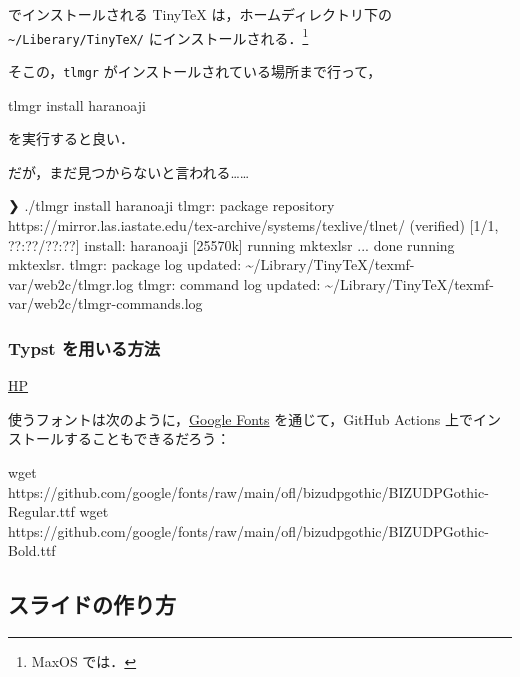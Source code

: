 \documentclass[
]{ltjsarticle}
\newenvironment{Shaded}{\begin{snugshade}}{\end{snugshade}}
\newcommand{\ControlFlowTok}[1]{\textcolor[rgb]{0.00,0.23,0.31}{#1}}
\newcommand{\ExtensionTok}[1]{\textcolor[rgb]{0.00,0.23,0.31}{#1}}
\newcommand{\FunctionTok}[1]{\textcolor[rgb]{0.28,0.35,0.67}{#1}}
\newcommand{\NormalTok}[1]{\textcolor[rgb]{0.00,0.23,0.31}{#1}}
\newcommand{\OperatorTok}[1]{\textcolor[rgb]{0.37,0.37,0.37}{#1}}
\newcommand{\PreprocessorTok}[1]{\textcolor[rgb]{0.68,0.00,0.00}{#1}}
\newcommand{\StringTok}[1]{\textcolor[rgb]{0.13,0.47,0.30}{#1}}
\begin{document}
でインストールされる TinyTeX は，ホームディレクトリ下の
\texttt{\textasciitilde{}/Liberary/TinyTeX/}
にインストールされる．\footnote{MaxOS では．}

そこの，\texttt{tlmgr} がインストールされている場所まで行って，

\begin{Shaded}
\begin{Highlighting}[]
\ExtensionTok{tlmgr}\NormalTok{ install haranoaji}
\end{Highlighting}
\end{Shaded}

を実行すると良い．

だが，まだ見つからないと言われる\ldots\ldots{}

\begin{Shaded}
\begin{Highlighting}[]
\ExtensionTok{❯}\NormalTok{ ./tlmgr install haranoaji        }
\ExtensionTok{tlmgr:}\NormalTok{ package repository https://mirror.las.iastate.edu/tex{-}archive/systems/texlive/tlnet/ }\OperatorTok{(verified)}
\ExtensionTok{[1/1,} \PreprocessorTok{??}\NormalTok{:}\PreprocessorTok{??}\NormalTok{/}\PreprocessorTok{??}\NormalTok{:}\PreprocessorTok{??}\NormalTok{] install: haranoaji }\PreprocessorTok{[}\StringTok{25570k}\PreprocessorTok{]}
\ExtensionTok{running}\NormalTok{ mktexlsr ...}
\ControlFlowTok{done} \ExtensionTok{running}\NormalTok{ mktexlsr.}
\ExtensionTok{tlmgr:}\NormalTok{ package log updated: \textasciitilde{}/Library/TinyTeX/texmf{-}var/web2c/tlmgr.log}
\ExtensionTok{tlmgr:}\NormalTok{ command log updated: \textasciitilde{}/Library/TinyTeX/texmf{-}var/web2c/tlmgr{-}commands.log}
\end{Highlighting}
\end{Shaded}

\subsubsection{Typst
を用いる方法}\label{typst-ux3092ux7528ux3044ux308bux65b9ux6cd5}

\href{https://typst.app/}{HP}

使うフォントは次のように，\href{https://fonts.google.com/specimen/BIZ+UDPGothic}{Google
Fonts} を通じて，GitHub Actions 上でインストールすることもできるだろう：

\begin{Shaded}
\begin{Highlighting}[]
\FunctionTok{wget}\NormalTok{ https://github.com/google/fonts/raw/main/ofl/bizudpgothic/BIZUDPGothic{-}Regular.ttf}
\FunctionTok{wget}\NormalTok{ https://github.com/google/fonts/raw/main/ofl/bizudpgothic/BIZUDPGothic{-}Bold.ttf}
\end{Highlighting}
\end{Shaded}

\subsection{スライドの作り方}\label{ux30b9ux30e9ux30a4ux30c9ux306eux4f5cux308aux65b9}
\end{document}
